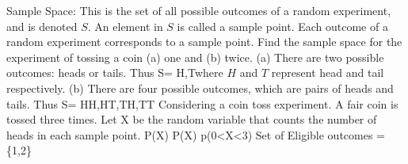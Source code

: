 
 

Sample Space: This is the set of all possible outcomes of a random experiment, and is denoted $S$. An element in $S$ is called a sample point.
Each outcome of a random experiment corresponds to a sample point.
Find the sample space for the experiment of tossing a coin (a) one and (b) twice.
(a) There are two possible outcomes: heads or tails.
Thus
S= {H,T}where $H$ and $T$ represent head and tail respectively.
(b) There are four possible outcomes, which are pairs of heads and tails.
Thus S= {HH,HT,TH,TT} 
Considering a coin toss experiment. A fair coin is tossed three times.
Let X be the random variable that counts the number of heads in each sample point.
P(X)
P(X)
p(0<X<3)
Set of Eligible outcomes = \{1,2\}


